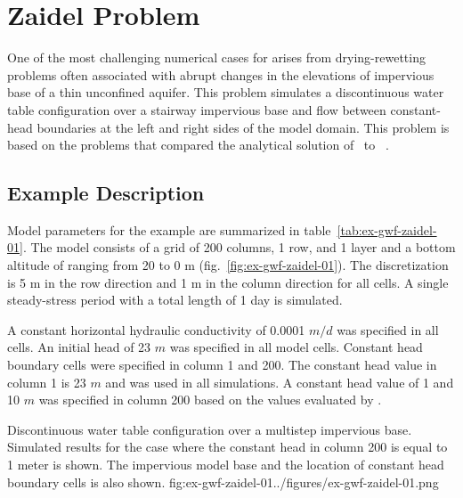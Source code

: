 \section{Zaidel Problem}

One of the most challenging numerical cases for \MF arises from drying-rewetting problems often associated with abrupt changes in the elevations of impervious base of a thin unconfined aquifer. This problem simulates a discontinuous water table configuration over a stairway impervious base and flow between constant-head boundaries at the left and right sides of the model domain. This problem is based on the problems that compared the analytical solution of \cite{zaidel2013discontinuous}~to \mfn~\cite[see][figure~6]{zaidel2013discontinuous}.

\subsection{Example Description}
Model parameters for the example are summarized in table~\ref{tab:ex-gwf-zaidel-01}. The model consists of a grid of 200 columns, 1 row, and 1 layer and a bottom altitude of ranging from 20 to 0 m (fig.~\ref{fig:ex-gwf-zaidel-01}). The discretization is 5 m in the row direction and 1 m in the column direction for all cells. A single steady-stress period with a total length of 1 day is simulated.



A constant horizontal hydraulic conductivity of 0.0001 $m/d$ was specified in all cells. An initial head of 23 $m$ was specified in all model cells. Constant head boundary cells were specified in column 1 and 200. The constant head value in column 1 is 23 $m$ and was used in all simulations. A constant head value of 1 and 10 $m$ was specified in column 200 based on the values evaluated by \cite{zaidel2013discontinuous}.


\begin{StandardFigure}{
                                     Discontinuous water table configuration over a multistep impervious base.
                                     Simulated results for the case where the constant head in column 200 is equal
                                     to 1 meter is shown. The impervious model base and the location of constant
                                     head boundary cells is also shown.
                                     }{fig:ex-gwf-zaidel-01}{../figures/ex-gwf-zaidel-01.png}
\end{StandardFigure}                                 


